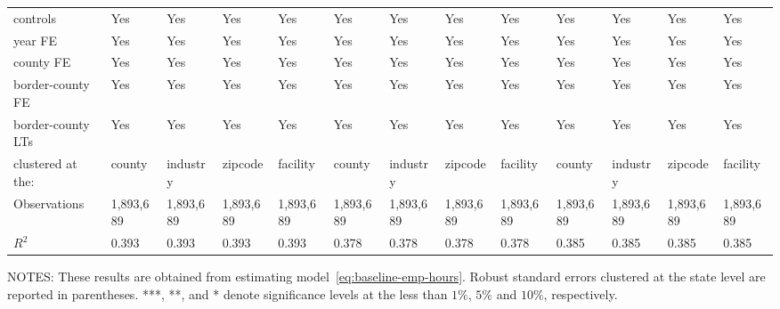 \begin{table}[H]
{\begin{tabular}{@{}lllllllllllll@{}}
            controls               & Yes       & Yes       & Yes       & Yes       & Yes       & Yes       & Yes       & Yes       & Yes       & Yes       & Yes       & Yes       \\
            year FE                & Yes       & Yes       & Yes       & Yes       & Yes       & Yes       & Yes       & Yes       & Yes       & Yes       & Yes       & Yes       \\
            county FE              & Yes       & Yes       & Yes       & Yes       & Yes       & Yes       & Yes       & Yes       & Yes       & Yes       & Yes       & Yes       \\
            border-county FE       & Yes       & Yes       & Yes       & Yes       & Yes       & Yes       & Yes       & Yes       & Yes       & Yes       & Yes       & Yes       \\
            border-county LTs      & Yes       & Yes       & Yes       & Yes       & Yes       & Yes       & Yes       & Yes       & Yes       & Yes       & Yes       & Yes       \\ \midrule
            clustered at the:      & county    & industry  & zipcode   & facility  & county    & industry  & zipcode   & facility  & county    & industry  & zipcode   & facility  \\
            Observations           & 1,893,689 & 1,893,689 & 1,893,689 & 1,893,689 & 1,893,689 & 1,893,689 & 1,893,689 & 1,893,689 & 1,893,689 & 1,893,689 & 1,893,689 & 1,893,689 \\
            $R^2$                  & 0.393     & 0.393     & 0.393     & 0.393     & 0.378     & 0.378     & 0.378     & 0.378     & 0.385     & 0.385     & 0.385     & 0.385     \\ \bottomrule \bottomrule
        \end{tabular}%
    }
    \begin{minipage}{\columnwidth}
        \vspace{0.05in}
        \tiny NOTES: These results are obtained from estimating model~\ref{eq:baseline-emp-hours}. Robust standard errors clustered at the state level are reported in parentheses. ***, **, and * denote significance levels at the less than $1\%$, $5\%$ and $10\%$, respectively.
    \end{minipage}
\end{table}